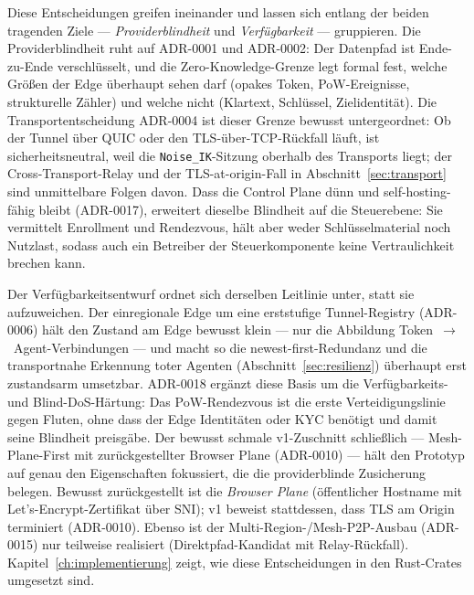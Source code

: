 Diese Entscheidungen greifen ineinander und lassen sich entlang der beiden
tragenden Ziele --- \emph{Providerblindheit} und \emph{Verfügbarkeit} ---
gruppieren. Die Providerblindheit ruht auf ADR-0001 und ADR-0002: Der Datenpfad
ist Ende-zu-Ende verschlüsselt, und die Zero-Knowledge-Grenze legt formal fest,
welche Größen der Edge überhaupt sehen darf (opakes Token, PoW-Ereignisse,
strukturelle Zähler) und welche nicht (Klartext, Schlüssel, Zielidentität). Die
Transportentscheidung ADR-0004 ist dieser Grenze bewusst untergeordnet: Ob der
Tunnel über QUIC oder den TLS-über-TCP-Rückfall läuft, ist sicherheitsneutral,
weil die \texttt{Noise\_IK}-Sitzung oberhalb des Transports liegt; der
Cross-Transport-Relay und der TLS-at-origin-Fall in Abschnitt~\ref{sec:transport}
sind unmittelbare Folgen davon. Dass die Control Plane dünn und self-hosting-fähig
bleibt (ADR-0017), erweitert dieselbe Blindheit auf die Steuerebene: Sie
vermittelt Enrollment und Rendezvous, hält aber weder Schlüsselmaterial noch
Nutzlast, sodass auch ein Betreiber der Steuerkomponente keine Vertraulichkeit
brechen kann.

Der Verfügbarkeitsentwurf ordnet sich derselben Leitlinie unter, statt sie
aufzuweichen. Der einregionale Edge um eine erststufige Tunnel-Registry
(ADR-0006) hält den Zustand am Edge bewusst klein --- nur die Abbildung
Token~$\rightarrow$~Agent-Verbindungen --- und macht so die newest-first-Redundanz
und die transportnahe Erkennung toter Agenten (Abschnitt~\ref{sec:resilienz})
überhaupt erst zustandsarm umsetzbar. ADR-0018 ergänzt diese Basis um die
Verfügbarkeits- und Blind-DoS-Härtung: Das PoW-Rendezvous ist die erste
Verteidigungslinie gegen Fluten, ohne dass der Edge Identitäten oder KYC benötigt
und damit seine Blindheit preisgäbe. Der bewusst schmale v1-Zuschnitt schließlich
--- Mesh-Plane-First mit zurückgestellter Browser Plane (ADR-0010) --- hält den
Prototyp auf genau den Eigenschaften fokussiert, die die providerblinde
Zusicherung belegen. Bewusst zurückgestellt ist die \emph{Browser Plane}
(öffentlicher Hostname mit
Let's-Encrypt-Zertifikat über SNI); v1 beweist stattdessen, dass TLS am Origin
terminiert (ADR-0010). Ebenso ist der Multi-Region-/Mesh-P2P-Ausbau (ADR-0015)
nur teilweise realisiert (Direktpfad-Kandidat mit Relay-Rückfall).
Kapitel~\ref{ch:implementierung} zeigt, wie diese Entscheidungen in den
Rust-Crates umgesetzt sind.
